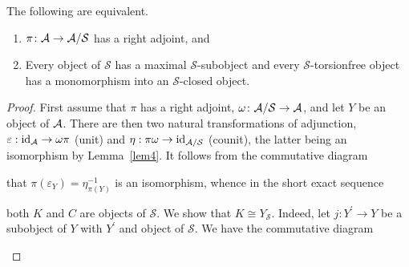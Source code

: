 \documentclass[dissertation.tex]{subfiles}
\begin{document}
\begin{thm}\label{thm1}
  The following are equivalent.
  \begin{enumerate}
  \item
    $\pi \colon \mathcal{A} \rightarrow \mathcal{A}/\mathcal{S}$ has a right adjoint, and
  \item
    Every object of $\mathcal{S}$ has a maximal $\mathcal{S}$-subobject and every $\mathcal{S}$-torsionfree object has a monomorphism into an $\mathcal{S}$-closed object.
  \end{enumerate}

  \begin{proof}
    First assume that $\pi$ has a right adjoint, $\omega \colon \mathcal{A}/\mathcal{S} \rightarrow \mathcal{A}$, and let $Y$ be an object of $\mathcal{A}$.
    There are then two natural transformations of adjunction, $\varepsilon : \operatorname{id}_{\mathcal{A}} \rightarrow \omega\pi$ (unit) and $\eta : \pi\omega \rightarrow \operatorname{id}_{\mathcal{A}/\mathcal{S}}$ (counit), the latter being an isomorphism by Lemma~\ref{lem4}.
    It follows from the commutative diagram
    \begin{center}
    \end{center}
    that $\pi(\varepsilon_Y) = \eta_{\pi(Y)}^{-1}$ is an isomorphism, whence in the short exact sequence    
    \begin{center}
    \end{center}
    both $K$ and $C$ are objects of $\mathcal{S}$.
    We show that $K \cong Y_\mathcal{S}$.
    Indeed, let $j \colon Y^\prime \rightarrow Y$ be a subobject of $Y$ with $Y^\prime$ and object of $\mathcal{S}$.
    We have the commutative diagram
    \begin{center}
    \end{center}

\end{proof}
\end{thm}
\end{document}
